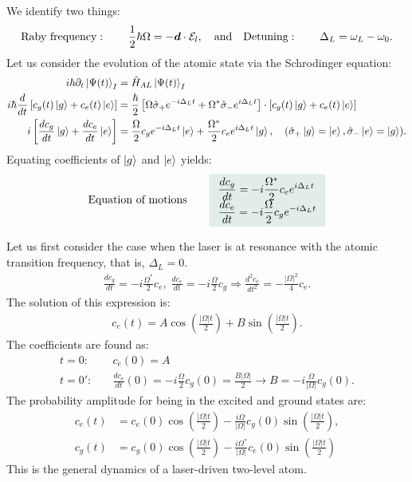We identify two things:
\begin{align}
    \text{Raby frequency}:\qquad \frac{1}{2}\hbar\Omega=-\bm{d}\cdot\mathcal{E}_l,\quad\text{and}\quad\text{Detuning}:\qquad\Delta_L=\omega_L-\omega_0.
\end{align}
Let us consider the evolution of the atomic state via the Schrodinger equation:
\begin{align*}
    i\hbar\partial_t\left|\Psi(t)\right\rangle_I&=\tilde{H}_{AL}\left|\Psi(t)\right\rangle_I\\
    i\hbar\frac{d}{dt}\left[c_g(t)\left|g\right\rangle+c_e(t)\left|e\right\rangle\right]&=\frac{\hbar}{2}\left[\Omega\hat{\sigma}_+e^{-i\Delta_Lt}+\Omega^*\hat{\sigma}_-e^{i\Delta_Lt}\right]
    \cdot\left[c_g(t)\left|g\right\rangle+c_e(t)\left|e\right\rangle\right]\\
    i\left[\frac{dc_g}{dt}\left|g\right\rangle+\frac{dc_e}{dt}\left|e\right\rangle\right]&=\frac{\Omega}{2}c_ge^{-i\Delta_Lt}\left|e\right\rangle+\frac{\Omega^*}{2}c_ee^{i\Delta_Lt}\left|g\right\rangle,\quad(\hat{\sigma}_+\left|g\right\rangle=\left|e\right\rangle,\hat{\sigma}_-\left|e\right\rangle=\left|g\right\rangle).
\end{align*}
Equating coefficients of $\left|g\right\rangle$ and $\left|e\right\rangle$ yields:
\begin{align}
    \text{Equation of motions}\qquad\highlight{
    \begin{array}{l}
        \displaystyle\frac{dc_g}{dt}=-i\frac{\Omega^*}{2}c_ee^{i\Delta_Lt}\\
        \displaystyle\frac{dc_e}{dt}=-i\frac{\Omega}{2}c_ge^{-i\Delta_Lt}
    \end{array}}
\end{align}

Let us first consider the case when the laser is at resonance with the atomic transition frequency, that is, $\Delta_L=0$.
\begin{align*}
    \frac{dc_g}{dt}=-i\frac{\Omega^*}{2}c_e,\;\frac{dc_e}{dt}=-i\frac{\Omega}{2}c_g\Longrightarrow\frac{d^2c_e}{dt^2}=-\frac{|\Omega|^2}{4}c_e.
\end{align*}
The solution of this expression is:
\begin{align}
    c_e(t)=A\cos\left(\frac{|\Omega|t}{2}\right)+B\sin\left(\frac{|\Omega|t}{2}\right).
\end{align}
The coefficients are found as:
\begin{align*}
    t=0:&\quad c_e(0)=A\\
    t=0':&\quad \frac{dc_e}{dt}(0)=-i\frac{\Omega}{2}c_g(0)=\frac{B|\Omega|}{2}\longrightarrow B=-i\frac{\Omega}{|\Omega|}c_g(0).
\end{align*}
The probability amplitude for being in the excited and ground states are:
\begin{align}
    c_e(t)&=c_e(0)\cos\left(\frac{|\Omega|t}{2}\right)-\frac{i\Omega}{|\Omega|}c_g(0)\sin\left(\frac{|\Omega|t}{2}\right),\\
    c_g(t)&=c_g(0)\cos\left(\frac{|\Omega|t}{2}\right)-\frac{i\Omega^*}{|\Omega|}c_e(0)\sin\left(\frac{|\Omega|t}{2}\right)
\end{align}
This is the general dynamics of a laser-driven two-level atom. 

